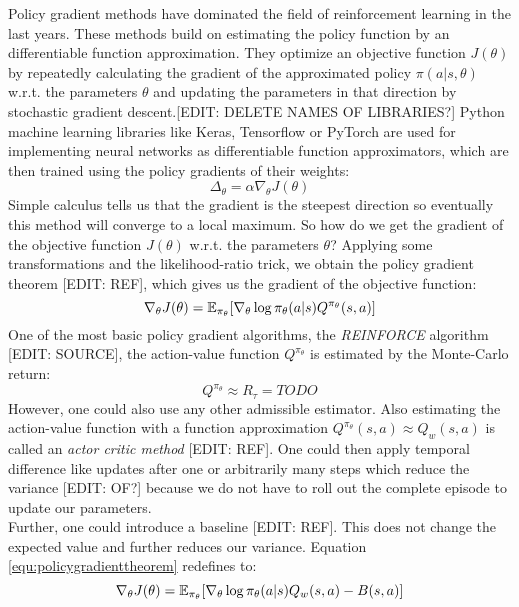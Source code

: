 Policy gradient methods have dominated the field of reinforcement learning in the last years. These methods build on estimating the policy function by an differentiable function approximation. They optimize an objective function $J(\theta)$ by repeatedly calculating the gradient of the approximated policy $\pi(a|s,\theta)$ w.r.t. the parameters $\theta$ and updating the parameters in that direction by stochastic gradient descent.[EDIT: DELETE NAMES OF LIBRARIES?] Python machine learning libraries like Keras, Tensorflow or PyTorch are used for implementing neural networks as differentiable function approximators, which are then trained using the policy gradients of their weights:
\begin{equation}
\label{equ:polupdate}
\Delta_{\theta} = \alpha \nabla_{\theta} J(\theta)
\end{equation}
Simple calculus tells us that the gradient is the steepest direction so eventually this method will converge to a local maximum. So how do we get the gradient of the objective function $J(\theta)$ w.r.t. the parameters $\theta$? Applying some transformations and the likelihood-ratio trick, we obtain the policy gradient theorem [EDIT: REF], which gives us the gradient of the objective function:
\begin{equation}
	\label{equ:policygradienttheorem}
	\nabla_{\theta}J(\theta)=\operatorname{\mathbb{E}}_{\pi_{\theta}}[\nabla_{\theta}\log\pi_{\theta}(a|s) Q^{\pi_{\theta}}(s, a)]
\end{equation}
One of the most basic policy gradient algorithms, the \textit{REINFORCE} algorithm [EDIT: SOURCE], the action-value function $Q^{\pi_{\theta}}$ is estimated by the Monte-Carlo return: 
\begin{equation}
\label{equ:reinforce}
Q^{\pi_\theta} \approx \mathit{R}_\tau = TODO
\end{equation}
However, one could also use any other admissible estimator. Also estimating the action-value function with a function approximation $Q^{\pi_\theta}(s, a) \approx Q_w(s,a)$ is called an \textit{actor critic method} [EDIT: REF]. One could then apply temporal difference like updates after one or arbitrarily many steps which reduce the variance [EDIT: OF?] because we do not have to roll out the complete episode to update our parameters.\\
Further, one could introduce a baseline [EDIT: REF]. This does not change the expected value and further reduces our variance. Equation \ref{equ:policygradienttheorem} redefines to:
\begin{equation}
\label{equ:policybaseline}
\nabla_{\theta}J(\theta)=\operatorname{\mathbb{E}}_{\pi_{\theta}}[\nabla_{\theta}\log\pi_{\theta}(a|s) Q_w(s, a) - B(s,a)]
\end{equation}
